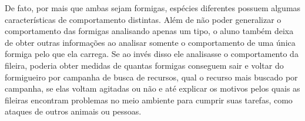 \documentclass[twocolumn, letterpaper]{scrartcl}
\begin{document}
De fato, por mais que ambas sejam formigas, espécies diferentes possuem algumas características de comportamento distintas. Além de não poder generalizar o comportamento das formigas analisando apenas um tipo, o aluno também deixa de obter outras informações ao analisar somente o comportamento de uma única formiga pelo que ela carrega. Se ao invés disso ele analisasse o comportamento da fileira, poderia obter medidas de quantas formigas conseguem sair e voltar do formigueiro por campanha de busca de recursos, qual o recurso mais buscado por campanha, se elas voltam agitadas ou não e até explicar os motivos pelos quais as fileiras encontram problemas no meio ambiente para cumprir suas tarefas, como ataques de outros animais ou pessoas. 







\end{document}
